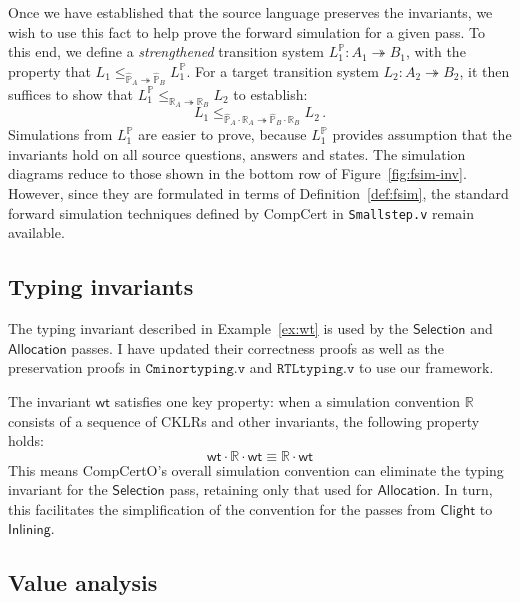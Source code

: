 \documentclass[11pt,oneside,draft]{book}
\theoremstyle{definition}
\newcommand{\kw}[1]{\ensuremath{ \mathsf{#1} }}
\begin{document}
Once we have established that
the source language preserves the invariants,
we wish to use this fact to help prove the forward simulation
for a given pass.
To this end,
we define a \emph{strengthened} transition system
$L_1^\mathbb{P} : A_1 \twoheadrightarrow B_1$,
with the property that
$
   L_1 \le_{\hat{\mathbb{P}}_A \twoheadrightarrow \hat{\mathbb{P}}_B}
   L_1^\mathbb{P}
$.
For a target transition system $L_2 : A_2 \twoheadrightarrow B_2$,
it then suffices to show that
$
  L_1^\mathbb{P}
  \le_{\mathbb{R}_A \twoheadrightarrow \mathbb{R}_B}
  L_2
$
to establish:
\[
  L_1
  \le_{\hat{\mathbb{P}}_A \cdot \mathbb{R}_A \twoheadrightarrow
       \hat{\mathbb{P}}_B \cdot \mathbb{R}_B}
  L_2 \,.
\]
Simulations from $L_1^\mathbb{P}$
are easier to prove,
because $L_1^\mathbb{P}$
provides assumption that the invariants hold
on all source questions, answers and states.
The simulation diagrams
reduce to those shown in the bottom row of
Figure~\ref{fig:fsim-inv}.
However, since they are formulated in terms of
Definition~\ref{def:fsim},
the standard forward simulation techniques
defined by CompCert
in \texttt{Smallstep.v}
remain available.


\subsection{Typing invariants} \label{sec:wt} %

The typing invariant described in Example~\ref{ex:wt}
is used by the $\kw{Selection}$ and $\kw{Allocation}$ passes.
I have updated their correctness proofs
as well as the preservation proofs in
$\texttt{Cminortyping.v}$ and $\texttt{RTLtyping.v}$
to use our framework.

The invariant $\kw{wt}$ satisfies one key property:
when a simulation convention $\mathbb{R}$
consists of a sequence of CKLRs and other invariants,
the following property holds:
\[
  \kw{wt} \cdot \mathbb{R} \cdot \kw{wt} \equiv
  \mathbb{R} \cdot \kw{wt}
\]
This means CompCertO's overall simulation convention
can eliminate the typing invariant for the $\kw{Selection}$ pass,
retaining only that used for $\kw{Allocation}$.
In turn, this facilitates the simplification of the convention for
the passes from \kw{Clight} to \kw{Inlining}.


\subsection{Value analysis} \label{sec:va} %
\end{document}
